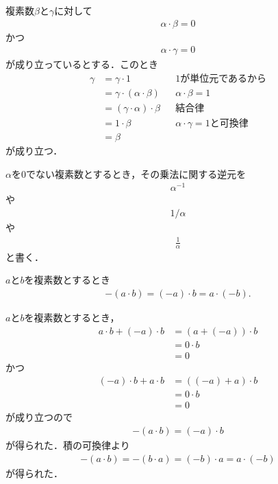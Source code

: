 	\begin{sketch}
		複素数$\beta$と$\gamma$に対して
		\begin{align}
			\alpha \cdot \beta = 0
		\end{align}
		かつ
		\begin{align}
			\alpha \cdot \gamma = 0
		\end{align}
		が成り立っているとする．このとき
		\begin{align}
			\gamma &= \gamma \cdot 1 &&\mbox{$1$が単位元であるから} \\
			&= \gamma \cdot (\alpha \cdot \beta) &&\mbox{$\alpha \cdot \beta = 1$} \\
			&= (\gamma \cdot \alpha) \cdot \beta &&\mbox{結合律} \\
			&= 1 \cdot \beta &&\mbox{$\alpha \cdot \gamma = 1$と可換律} \\
			&= \beta
		\end{align}
		が成り立つ．
		\QED
	\end{sketch}
	
	$\alpha$を$0$でない複素数とするとき，その乗法に関する逆元を
	\begin{align}
		\alpha^{-1}
	\end{align}
	や
	\begin{align}
		1/\alpha
	\end{align}
	や
	\begin{align}
		\frac{1}{\alpha}
	\end{align}
	と書く．
	
	
	\begin{screen}
		\begin{thm}[積の逆元は逆元の積]
		\label{thm:inverse_of_product}
			$a$と$b$を複素数とするとき
			\begin{align}
				-(a \cdot b) = (-a) \cdot b = a \cdot (-b).
			\end{align}
		\end{thm}
	\end{screen}
	
	\begin{sketch}
		$a$と$b$を複素数とするとき，
		\begin{align}
			a \cdot b + (-a) \cdot b
			&= (a + (-a)) \cdot b \\
			&= 0 \cdot b \\
			&= 0
		\end{align}
		かつ
		\begin{align}
			(-a) \cdot b + a \cdot b
			&= ((-a) + a) \cdot b \\
			&= 0 \cdot b \\
			&= 0
		\end{align}
		が成り立つので
		\begin{align}
			-(a \cdot b) = (-a) \cdot b
		\end{align}
		が得られた．積の可換律より
		\begin{align}
			-(a \cdot b) = -(b \cdot a) = (-b) \cdot a = a \cdot (-b)
		\end{align}
		が得られた．
		\QED
	\end{sketch}
	
